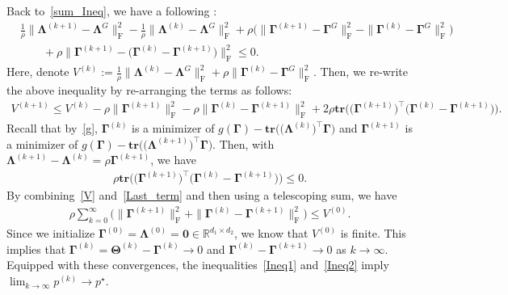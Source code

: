 \documentclass[12pt]{article}
\begin{document}
Back to~\eqref{sum_Ineq}, we have a following :
\begin{align*}
    &\frac{1}{\rho} \| \boldsymbol{\Lambda}^{(k+1)} - \boldsymbol{\Lambda}^{G} \|_{\text{F}}^{2} - \frac{1}{\rho} \| \boldsymbol{\Lambda}^{(k)} - \boldsymbol{\Lambda}^{G} \|_{\text{F}}^{2}
    + \rho \bigg( \| \boldsymbol{\Gamma}^{(k+1)} - \boldsymbol{\Gamma}^{G} \|_{\text{F}}^{2} 
    - \| \boldsymbol{\Gamma}^{(k)} - \boldsymbol{\Gamma}^{G} \|_{\text{F}}^{2} \bigg) \\
    &\qquad + \rho \| \boldsymbol{\Gamma}^{(k+1)} - \big( \boldsymbol{\Gamma}^{(k)} - \boldsymbol{\Gamma}^{(k+1)} \big) \|_{\text{F}}^{2} \leq 0.
\end{align*}
Here, denote $V^{(k)}:=\frac{1}{\rho} \| \boldsymbol{\Lambda}^{(k)} - \boldsymbol{\Lambda}^{G} \|_{\text{F}}^{2} + \rho \| \boldsymbol{\Gamma}^{(k)} - \boldsymbol{\Gamma}^{G} \|_{\text{F}}^{2}$.
Then, we re-write the above inequality by re-arranging the terms as follows:
\begin{align} \label{V}
    V^{(k+1)} \leq V^{(k)} - \rho \| \boldsymbol{\Gamma}^{(k+1)} \|_{\text{F}}^{2} - \rho \| \boldsymbol{\Gamma}^{(k)} - \boldsymbol{\Gamma}^{(k+1)} \|_{\text{F}}^{2} + 2 \rho \textbf{tr}\big( \big( \boldsymbol{\Gamma}^{(k+1)} \big)^{\top} \big( \boldsymbol{\Gamma}^{(k)} - \boldsymbol{\Gamma}^{(k+1)} \big)\big). 
\end{align}
Recall that by~\eqref{g}, $\boldsymbol{\Gamma}^{(k)}$ is a minimizer of 
$g(\boldsymbol{\Gamma}) - \textbf{tr} \big( \big( \boldsymbol{\Lambda}^{(k)}\big)^{\top} \boldsymbol{\Gamma} \big)$ and 
$\boldsymbol{\Gamma}^{(k+1)}$ is a minimizer of 
$g(\boldsymbol{\Gamma}) - \textbf{tr} \big( \big( \boldsymbol{\Lambda}^{(k+1)}\big)^{\top} \boldsymbol{\Gamma} \big)$.
Then, with $\boldsymbol{\Lambda}^{(k+1)}-\boldsymbol{\Lambda}^{(k)}=\rho\boldsymbol{\Gamma}^{(k+1)}$, we have 
\begin{align} \label{Last_term}
    \rho\textbf{tr}\big(\big(\boldsymbol{\Gamma}^{(k+1)}\big)^{\top}\big(\boldsymbol{\Gamma}^{(k)}-\boldsymbol{\Gamma}^{(k+1)}\big)\big) \leq 0.
\end{align}
By combining~\eqref{V} and~\eqref{Last_term} and then using a telescoping sum, we have
\begin{align}
    \rho \sum_{k=0}^{\infty}\bigg( \| \boldsymbol{\Gamma}^{(k+1)} \|_{\text{F}}^{2} + \| \boldsymbol{\Gamma}^{(k)} - \boldsymbol{\Gamma}^{(k+1)} \|_{\text{F}}^{2} \bigg) \leq V^{(0)}.
\end{align}
Since we initialize $\boldsymbol{\Gamma}^{(0)}=\boldsymbol{\Lambda}^{(0)}=\boldsymbol{0} \in \mathbb{R}^{d_{1} \times d_{2}}$, we know that $V^{(0)}$ is finite.
This implies that $\boldsymbol{\Gamma}^{(k)}=\boldsymbol{\Theta}^{(k)}-\boldsymbol{\Gamma}^{(k)}\rightarrow{0}$ and $\boldsymbol{\Gamma}^{(k)} - \boldsymbol{\Gamma}^{(k+1)}\rightarrow{0}$ as $k\rightarrow{\infty}$.
Equipped with these convergences, the inequalities~\eqref{Ineq1} and~\eqref{Ineq2} imply $\lim_{k\rightarrow{\infty}}p^{(k)}\rightarrow{p^{\star}}$.
\end{document}
